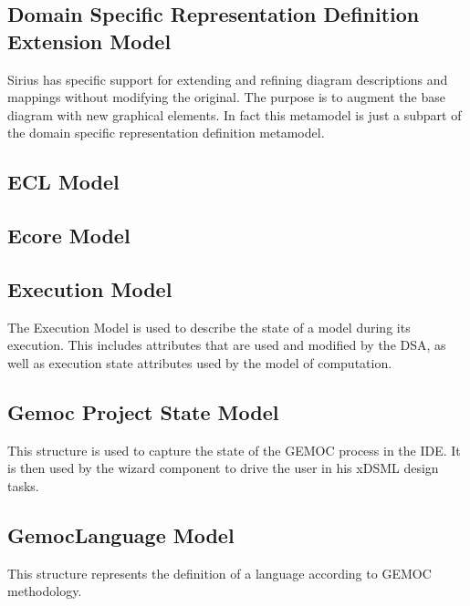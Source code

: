 \documentclass{gemoc} %
\begin{document}

\subsection{Domain Specific Representation Definition Extension Model}
\label{sec:Domain_Specific_Representation_Definition_Extension_Model}
Sirius has specific support for extending and refining diagram descriptions and mappings without modifying the original. The purpose is to augment the base diagram with new graphical elements. In fact this metamodel is just a subpart of the domain specific representation definition metamodel.

\subsection{ECL Model}
\label{sec:ECL_Model}


\subsection{Ecore Model}
\label{sec:Ecore_Model}


\subsection{Execution Model}
\label{sec:Execution_Model}
The Execution Model is used to describe the state of a model during its execution. This includes attributes that are used and modified by the DSA, as well as execution state attributes used by the model of computation.

\subsection{Gemoc Project State Model}
\label{sec:Gemoc_Project_State_Model}
This structure is used to capture the state of the GEMOC process in the IDE. It is then used by the wizard component to drive the user in his xDSML design tasks.

\subsection{GemocLanguage Model}
\label{sec:GemocLanguage_Model}
This structure represents the definition of a language according to GEMOC methodology.
\end{document}
